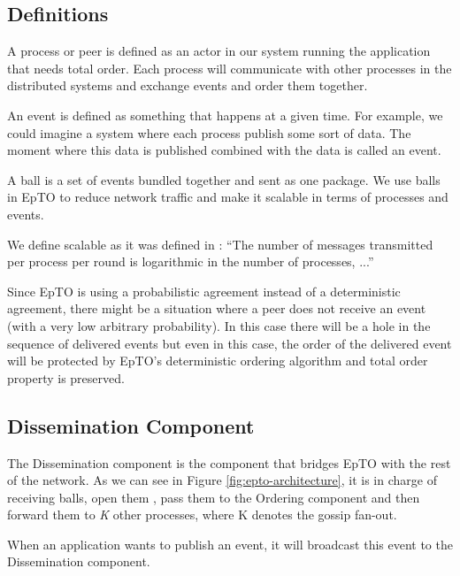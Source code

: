 \documentclass[10pt,conference,a4paper]{IEEEtran}
\begin{document}
\subsection{Definitions}
A process or peer is defined as an actor in our system running the application that needs total order. Each process will communicate with other processes in the distributed systems and exchange events and order them together.
\par
An event is defined as something that happens at a given time. For example, we could imagine a system where each process publish some sort of data. The moment where this data is published combined with the data is called an event.
\par
A ball is a set of events bundled together and sent as one package. We use balls in EpTO to reduce network traffic and make it scalable in terms of processes and events.

We define scalable as it was defined in  \autocite{matos2015epto}:  ``The number
of messages transmitted per process per round is logarithmic
in the number of processes, ...''

\par
Since EpTO is using a probabilistic agreement instead of a deterministic agreement, there might be a situation where a peer does not receive an event (with a very low arbitrary probability). In this case there will be a hole in the sequence of delivered events but even in this case, the order of the delivered event will be protected by EpTO's deterministic ordering algorithm and total order property is preserved.
\subsection{Dissemination Component}
The Dissemination component is the component that bridges EpTO with the rest of the network. As we can see in Figure \ref*{fig:epto-architecture}, it is in charge of receiving balls, open them , pass them to the Ordering component and then forward them to \textit{K} other processes, where K denotes the gossip fan-out.
\par
When an application wants to publish an event, it will broadcast this event to the Dissemination component.
\end{document}
